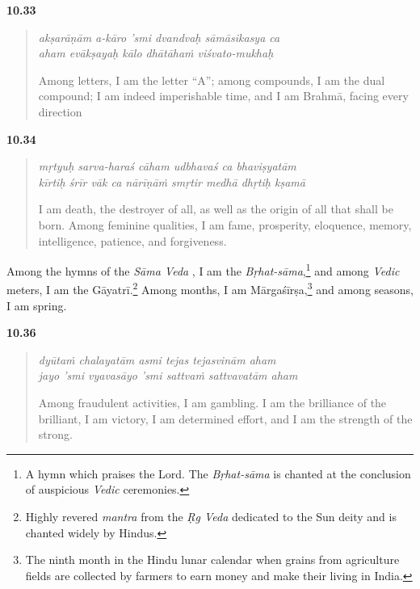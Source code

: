 \par\noindent\textbf{10.33}\par
\begin{verse}
\textit{akṣarāṇām a-kāro ’smi dvandvaḥ sāmāsikasya ca} \\
\textit{aham evākṣayaḥ kālo dhātāhaṁ viśvato-mukhaḥ}

\noindent Among letters, I am the letter \enquote{A}; among compounds, I am the dual compound; I am indeed imperishable time, and I am Brahmā, facing every direction
\end{verse}
\par



\par\noindent\textbf{10.34}\par
\begin{verse}
\textit{mṛtyuḥ sarva-haraś cāham udbhavaś ca bhaviṣyatām} \\
\textit{kīrtiḥ śrīr vāk ca nārīṇāṁ smṛtir medhā dhṛtiḥ kṣamā}

\noindent I am death, the destroyer of all, as well as the origin of all that shall be born. Among feminine qualities, I am fame, prosperity, eloquence, memory, intelligence, patience, and forgiveness.
\end{verse}
\par


{Among the hymns of the \textit{Sāma Veda} , I am the \textit{Bṛhat-sāma},\footnote{A hymn which praises the Lord. The \textit{Bṛhat-sāma} is chanted at the conclusion of auspicious \textit{Vedic} ceremonies.} and among \textit{Vedic} meters, I am the Gāyatrī.\footnote{Highly revered \textit{mantra} from the \textit{Ṛg Veda} dedicated to the Sun deity and is chanted widely by Hindus.} Among months, I am Mārgaśīrṣa,\footnote{The ninth month in the Hindu lunar calendar when grains from agriculture fields are collected by farmers to earn money and make their living in India.} and among seasons, I am spring.}


\par\noindent\textbf{10.36}\par
\begin{verse}
\textit{dyūtaṁ chalayatām asmi tejas tejasvinām aham} \\
\textit{jayo ’smi vyavasāyo ’smi sattvaṁ sattvavatām aham}

\noindent Among fraudulent activities, I am gambling. I am the brilliance of the brilliant, I am victory, I am determined effort, and I am the strength of the strong.
\end{verse}
\par


